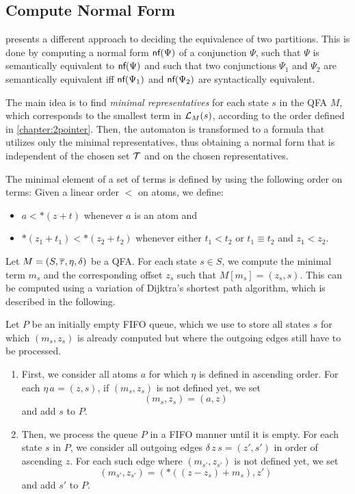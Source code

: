 \subsection{Compute Normal Form}

\textcite{2pointer} presents a different approach to deciding the equivalence of two partitions.
This is done by computing a normal form $\textsf{nf}(\Psi)$ of a conjunction $\Psi$, such that $\Psi$ is semantically equivalent to $\textsf{nf}(\Psi)$ and such that two conjunctions $\Psi_1$ and $\Psi_2$ are semantically equivalent iff $\textsf{nf}(\Psi_1)$ and $\textsf{nf}(\Psi_2)$ are syntactically equivalent.

The main idea is to find \emph{minimal representatives} for each state $s$ in the QFA $M$,
which corresponds to the smallest term in $\mathcal{L}_{M}(s)$, according to the order defined in \cref{chapter:2pointer}.
Then, the automaton is transformed to a formula that utilizes only the minimal representatives, thus obtaining a normal form that is independent of the chosen set $\mathcal{T}$ and on the chosen representatives.

The minimal element of a set of terms is defined by using the following order on terms:
Given a linear order $<$ on atoms, we define:
\begin{itemize}
  \item $a < *(z+t)$ whenever $a$ is an atom and
  \item $*(z_1 + t_1) < *(z_2 + t_2)$ whenever either $t_1 < t_2$ or $t_1 \equiv t_2$ and $z_1 < z_2$.
\end{itemize}



Let $M = (S, \overline{\tau}, \eta, \delta)$ be a QFA.\@
For each state $s \in S$, we compute the minimal term $m_s$ and the corresponding offset $z_s$ such that $M[m_s] = (z_s,s)$.
This can be computed using a variation of Dijktra's shortest path algorithm, which is described in the following.

Let $P$ be an initially empty FIFO queue, which we use to store all states $s$ for which $(m_s,z_s)$ is already computed but where the outgoing edges still have to be processed.

\begin{enumerate}
    \item
          First, we consider all atoms $a$ for which $\eta$ is defined in ascending order. For each $\eta\,a = (z,s)$, if $(m_s,z_s)$ is not defined yet, we set
          \[
              (m_s,z_s) = (a,z)
          \]
          and add $s$ to $P$.
    \item
          Then, we process the queue $P$ in a FIFO manner until it is empty.
          For each state $s$ in $P$, we consider all outgoing edges $\delta\,z\,s = (z',s')$ in order of ascending $z$.
          For each such edge where $(m_{s'},z_{s'})$ is not defined yet, we set
          \[
              (m_{s'},z_{s'}) = (*((z-z_s)+m_s),z')
          \]
          and add $s'$ to $P$.
\end{enumerate}

